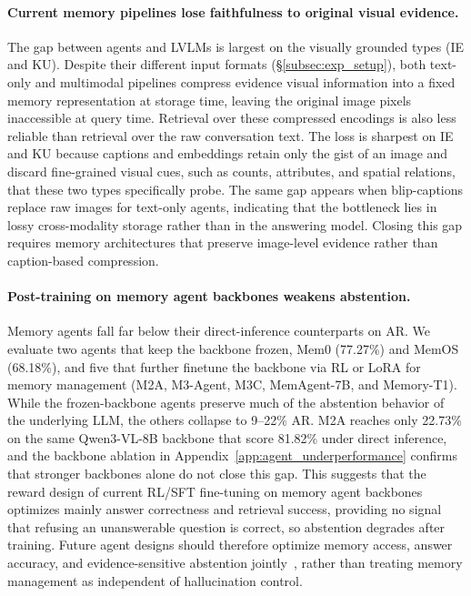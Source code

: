 \documentclass{llmxive}
\begin{document}
\paragraph{Current memory pipelines lose faithfulness to original visual evidence.}
The gap between agents and LVLMs is largest on the visually grounded types (IE and KU). Despite their different input formats (\S\ref{subsec:exp_setup}), both text-only and multimodal pipelines compress evidence visual information into a fixed memory representation at storage time, leaving the original image pixels inaccessible at query time. Retrieval over these compressed encodings is also less reliable than retrieval over the raw conversation text. The loss is sharpest on IE and KU because captions and embeddings retain only the gist of an image and discard fine-grained visual cues, such as counts, attributes, and spatial relations, that these two types specifically probe. The same gap appears when blip-captions replace raw images for text-only agents, indicating that the bottleneck lies in lossy cross-modality storage rather than in the answering model. Closing this gap requires memory architectures that preserve image-level evidence rather than caption-based compression.

\paragraph{Post-training on memory agent backbones weakens abstention.}
Memory agents fall far below their direct-inference counterparts on AR. We evaluate two agents that keep the backbone frozen, Mem0 (77.27\%) and MemOS (68.18\%), and five that further finetune the backbone via RL or LoRA for memory management (M2A, M3-Agent, M3C, MemAgent-7B, and Memory-T1). While the frozen-backbone agents preserve much of the abstention behavior of the underlying LLM, the others collapse to 9--22\% AR. M2A reaches only 22.73\% on the same Qwen3-VL-8B backbone that score 81.82\% under direct inference, and the backbone ablation in Appendix~\ref{app:agent_underperformance} confirms that stronger backbones alone do not close this gap. This suggests that the reward design of current RL/SFT fine-tuning on memory agent backbones optimizes mainly answer correctness and retrieval success, providing no signal that refusing an unanswerable question is correct, so abstention degrades after training. Future agent designs should therefore optimize memory access, answer accuracy, and evidence-sensitive abstention jointly~\citep{zhai2026abstainr1}, rather than treating memory management as independent of hallucination control.
\end{document}
